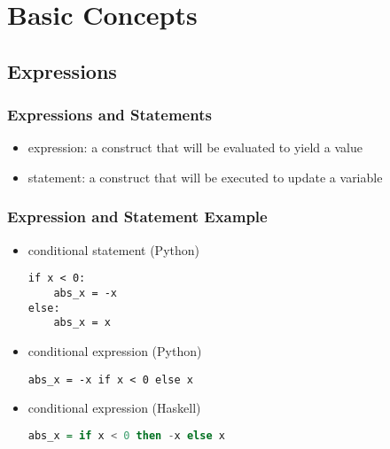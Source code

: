 \documentclass[dvipsnames]{beamer}
\theoremstyle{plain}
\begin{document}
\section{Basic Concepts}

\subsection{Expressions}

\begin{frame}
  \frametitle{Expressions and Statements}

  \medskip
  \begin{itemize}
    \item \alert{expression}: a construct that will be evaluated
      to yield a value

    \medskip
    \item \alert{statement}: a construct that will be executed
      to update a variable
  \end{itemize}
\end{frame}

\begin{frame}[fragile]
  \frametitle{Expression and Statement Example}

  \begin{itemize}
    \item conditional statement (Python)
    \smallskip
    \begin{lstlisting}
if x < 0:
    abs_x = -x
else:
    abs_x = x
    \end{lstlisting}

    \pause
    \medskip
    \item conditional expression (Python)
    \smallskip
    \begin{lstlisting}
abs_x = -x if x < 0 else x
    \end{lstlisting}

    \pause
    \medskip
    \item conditional expression (Haskell)
    \smallskip
    \begin{lstlisting}[language=haskell]
abs_x = if x < 0 then -x else x
    \end{lstlisting}
  \end{itemize}
\end{frame}
\end{document}
